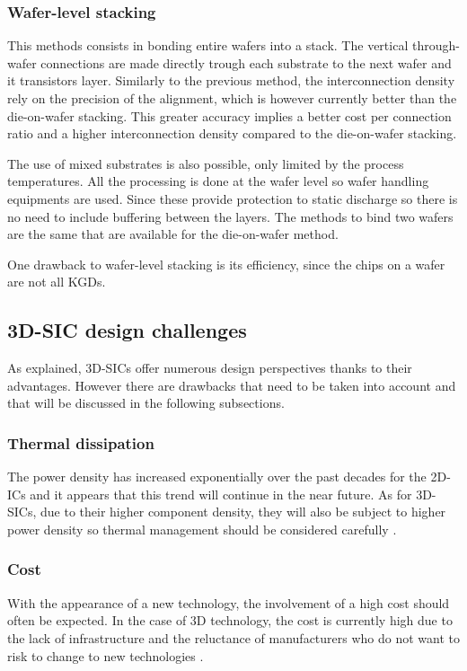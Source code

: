 \subsubsection{Wafer-level stacking}

This methods consists in bonding entire wafers into a stack. The vertical through-wafer connections are made directly trough each substrate to the next wafer and it transistors layer. Similarly to the previous method, the interconnection density rely on the precision of the alignment, which is however currently better than the die-on-wafer stacking. This greater accuracy implies a better cost per connection ratio and a higher interconnection density compared to the die-on-wafer stacking.

The use of mixed substrates is also possible, only limited by the process temperatures. All the processing is done at the wafer level so wafer handling equipments are used. Since these provide protection to static discharge so there is no need to include buffering between the layers. The methods to bind two wafers are the same that are available for the die-on-wafer method.

One drawback to wafer-level stacking is its efficiency, since the chips on a wafer are not all KGDs.

\subsection{3D-SIC design challenges}

As explained, 3D-SICs offer numerous design perspectives thanks to their advantages. However there are drawbacks that need to be taken into account and that will be discussed in the following subsections.

\subsubsection{Thermal dissipation}
The power density has increased exponentially over the past decades for the 2D-ICs and it appears that this trend will continue in the near future. As for 3D-SICs, due to their higher component density, they will also be subject to higher power density so thermal management should be considered carefully \cite{659500}. 

\subsubsection{Cost}
With the appearance of a new technology, the involvement of a high cost should often be expected. In the case of 3D technology, the cost is currently high due to the lack of infrastructure and the reluctance of manufacturers who do not want to risk to change to new technologies \cite{659500}.


